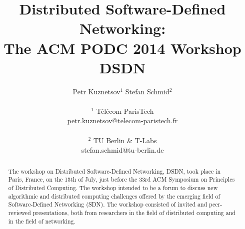 \documentclass[11pt,pdftex,letter]{article}
\def\SAVESPACE{1}
\begin{document}
\sloppy




\title{Distributed Software-Defined Networking:\\ The ACM PODC 2014 Workshop \textbf{DSDN}}



\author{
Petr Kuznetsov$^{1}$ \quad Stefan Schmid$^{2}$\\
\\
       $^{1}$ T\'el\'ecom ParisTech\\
        petr.kuznetsov@telecom-paristech.fr\\
\\
        $^{2}$ TU Berlin \& T-Labs \\ %
	    stefan.schmid@tu-berlin.de}


\date{}


\maketitle


\thispagestyle{empty}





\begin{abstract}
The workshop on Distributed Software-Defined Networking, DSDN, took
place in Paris, France, on the 15th of July, just before
the 33rd ACM Symposium on Principles of Distributed Computing.
The workshop intended to be a forum to discuss new algorithmic and
distributed computing challenges offered by the emerging field of
Software-Defined Networking (SDN).
The workshop consisted of invited and peer-reviewed presentations, both
from researchers in the field of
distributed computing and in the field of networking.
\end{abstract}
\end{document}
